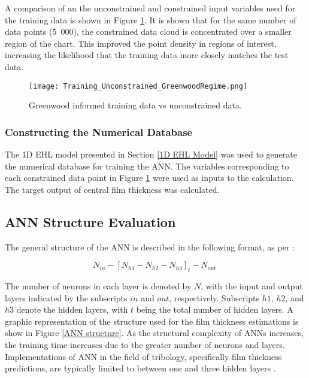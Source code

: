 A comparison of an the unconstrained and constrained input variables used for the training data is shown in Figure \ref{Training_Unconstrained_GreenwoodRegime}. It is shown that for the same number of data points (5~000), the constrained data cloud is concentrated over a smaller region of the chart. This improved the point density in regions of interest, increasing the likelihood that the training data more closely matches the test data.

\begin{figure}
	\centering  
	\texttt{[image: Training\_Unconstrained\_GreenwoodRegime.png]}
	\caption{Greenwood informed training data vs unconstrained data.}
	\label{Training_Unconstrained_GreenwoodRegime}
\end{figure} 

\subsubsection{Constructing the Numerical Database}

The 1D EHL model presented in Section \ref{1D EHL Model} was used to generate the numerical database for training the ANN. The variables corresponding to each constrained data point in Figure \ref{Training_Unconstrained_GreenwoodRegime} were used as inputs to the calculation. The target output of central film thickness was calculated.

\subsection{ANN Structure Evaluation} \label{ANN Structure Evaluation}

The general structure of the ANN is described in the following format, as per \cite{Zhang2002}:

\begin{equation}
	N_{i n}-\left[N_{h 1}-N_{h 2}-N_{h 3}\right]_t-N_{\text {out }}
\end{equation}

The number of neurons in each layer is denoted by $N$, with the input and output layers indicated by the subscripts $in$ and $out$, respectively. Subscripts $h1$, $h2$, and $h3$ denote the hidden layers, with $t$ being the total number of hidden layers. A graphic representation of the structure used for the film thickness estimations is show in Figure \ref{ANN structure}. As the structural complexity of ANNs increases, the training time increases due to the greater number of neurons and layers. Implementations of ANN in the field of tribology, specifically film thickness predictions, are typically limited to between one and three hidden layers \cite{Marian2021}.

